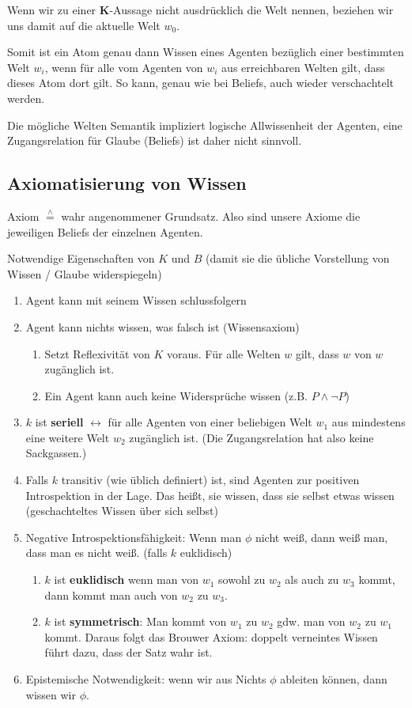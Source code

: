 \documentclass[runningheads,deutsch]{llncs}
\newcommand{\estimates}{\overset{\scriptscriptstyle\wedge}{=}}
\begin{document}
Wenn wir zu einer \textbf{K}-Aussage nicht ausdrücklich die Welt nennen, beziehen wir uns damit auf die aktuelle Welt $w_0$.

Somit ist ein Atom genau dann Wissen eines Agenten bezüglich einer bestimmten Welt $w_i$, wenn für alle vom Agenten von $w_i$ aus erreichbaren Welten gilt, dass dieses Atom dort gilt. So kann, genau wie bei Beliefs, auch wieder verschachtelt werden.

Die mögliche Welten Semantik impliziert logische Allwissenheit der Agenten, eine Zugangsrelation für Glaube (Beliefs) ist daher nicht sinnvoll.

\subsection{Axiomatisierung von Wissen}

Axiom $\estimates$ wahr angenommener Grundsatz. Also sind unsere Axiome die jeweiligen Beliefs der einzelnen Agenten.

Notwendige Eigenschaften von $K$ und $B$ (damit sie die übliche Vorstellung von Wissen / Glaube widerspiegeln)

\begin{enumerate}
    \item Agent kann mit seinem Wissen schlussfolgern
    \item Agent kann nichts wissen, was falsch ist (Wissensaxiom)
    \begin{enumerate}
        \item Setzt Reflexivität von $K$ voraus. Für alle Welten $w$ gilt, dass $w$ von $w$ zugänglich ist.
        \item Ein Agent kann auch keine Widersprüche wissen (z.B. $P \land \lnot P$)
    \end{enumerate}
    \item $k$ ist \textbf{seriell} $\leftrightarrow$ für alle Agenten von einer beliebigen Welt $w_1$ aus mindestens eine weitere Welt $w_2$ zugänglich ist. (Die Zugangsrelation hat also keine Sackgassen.)
    \item Falls $k$ transitiv (wie üblich definiert) ist, sind Agenten zur positiven Introspektion in der Lage. Das heißt, sie wissen, dass sie selbst etwas wissen (geschachteltes Wissen über sich selbst)
    \item Negative Introspektionsfähigkeit: Wenn man $\phi$ nicht weiß, dann weiß man, dass man es nicht weiß. (falls $k$ euklidisch)
    \begin{enumerate}
        \item $k$ ist \textbf{euklidisch} wenn man von $w_1$ sowohl zu $w_2$ als auch zu $w_3$ kommt, dann kommt man auch von $w_2$ zu $w_3$.
        \item $k$ ist \textbf{symmetrisch}: Man kommt von $w_1$ zu $w_2$ gdw. man von $w_2$ zu $w_1$ kommt. Daraus folgt das Brouwer Axiom: doppelt verneintes Wissen führt dazu, dass der Satz wahr ist.
    \end{enumerate}
    \item Epistemische Notwendigkeit: wenn wir aus Nichts $\phi$ ableiten können, dann wissen wir $\phi$.
\end{enumerate}
\end{document}
